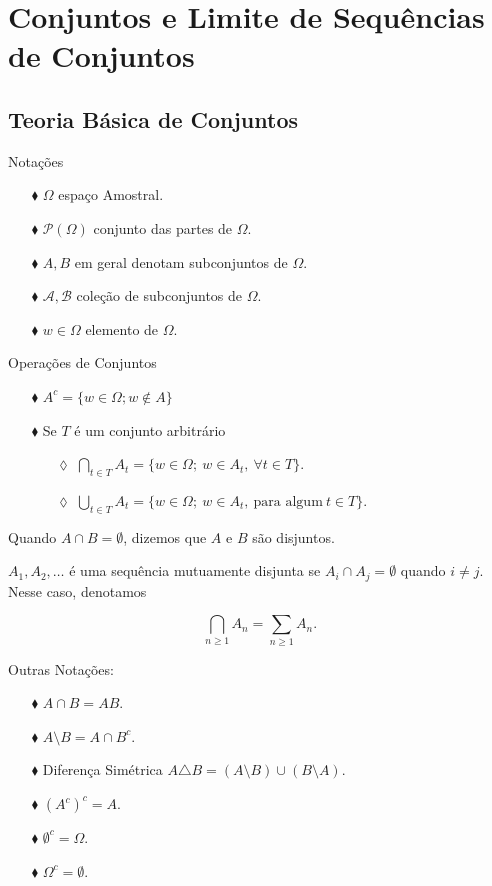 \chapter[Aula 1]{Conjuntos e Limite de Sequências de Conjuntos}
\chaptermark{}




\section{Teoria Básica de Conjuntos}
Notações

\begin{enumerate}
\item[$\blacklozenge$] $\Omega$ espaço Amostral.
\item[$\blacklozenge$] $\mathcal{P}(\Omega)$ conjunto das partes de $\Omega$.
\item[$\blacklozenge$] $A,B$ em geral denotam subconjuntos de $\Omega$.
\item[$\blacklozenge$] $\mathcal{A}, \mathcal{B}$ coleção de subconjuntos de $\Omega$.
\item[$\blacklozenge$] $w \in \Omega$ elemento de $\Omega$.
\end{enumerate}


Operações de Conjuntos


\begin{enumerate}
\item[$\blacklozenge$] $A^{c}= \{w \in \Omega; w \notin A\}$
\item[$\blacklozenge$] Se $T$ é um conjunto arbitrário
	\begin{enumerate}
	\item[$\lozenge$]  $\displaystyle\bigcap_{t \in T}{A_t}
							= 
						\{ w \in \Omega;\ w \in A_t,\ \forall t \in T\}$.
	\item[$\lozenge$]  $\displaystyle\bigcup_{t \in T}{A_t}
							= 
						\{ w \in \Omega;\ w \in A_t,\ \text{para algum}\ t \in T \}$.
	\end{enumerate}
\end{enumerate}

Quando $A \cap B = \emptyset$, dizemos que $A$ e $B$ são disjuntos.

$A_1, A_2,\ldots$ é uma sequência mutuamente disjunta se $A_i \cap A_j = \emptyset$ 
quando $i \neq j$. Nesse caso, denotamos

$$
	\displaystyle\bigcap_{n \geqslant 1}{A_n} = \sum_{n \geqslant 1} A_n.	
$$

Outras Notações:

\begin{enumerate}
\item[$\blacklozenge$] $ A \cap B = AB$.
\item[$\blacklozenge$] $A \setminus B = A \cap B^c$.
\item[$\blacklozenge$] Diferença Simétrica $A\triangle B = (A \setminus B) \cup (B\setminus A).$
\item[$\blacklozenge$] $(A^c)^c = A $.
\item[$\blacklozenge$] $\emptyset^c = \Omega$.
\item[$\blacklozenge$] $\Omega^c = \emptyset$.
\end{enumerate}

